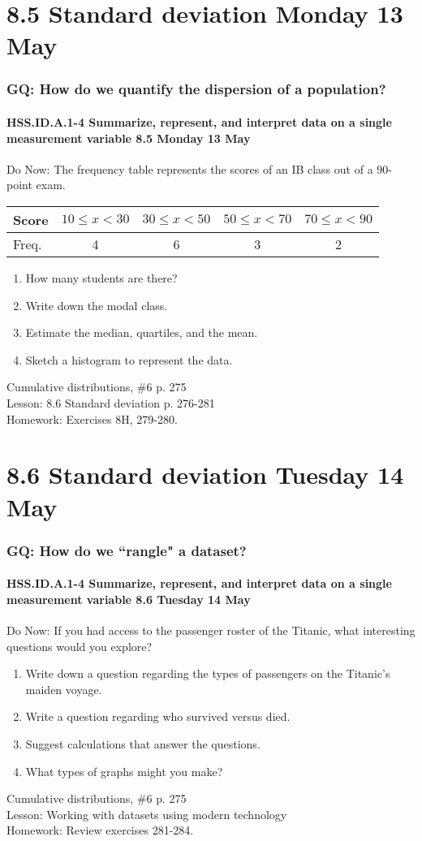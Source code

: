 \documentclass{beamer}
\begin{document}
\section{8.5 Standard deviation Monday 13 May}
  \frame
  {
    \frametitle{GQ: How do we quantify the dispersion of a population?}
    \framesubtitle{HSS.ID.A.1-4 Summarize, represent, and interpret data on a single measurement variable \hfill \alert{8.5 Monday 13 May}}

    \begin{block}{Do Now: The frequency table represents the scores of an IB class out of a 90-point exam.}
        \begin{tabular}{|l|c|c|c|c|}
          \hline
          Score & $10 \leq x<30$ &
            $30 \leq x<50$ & $50 \leq x<70$ & $70 \leq x<90$\\
          \hline
          Freq. & 4 & 6 & 3 & 2\\
          \hline
        \end{tabular}
        \begin{enumerate}
          \item How many students are there?
          \item Write down the modal class.
          \item Estimate the median, quartiles, and the mean.
          \item Sketch a histogram to represent the data.
      \end{enumerate}
    \end{block}
    Cumulative distributions, \#6 p. 275\\
    Lesson: 8.6 Standard deviation p. 276-281\\[0.5cm]
    Homework: Exercises 8H, 279-280.
  }

\section{8.6 Standard deviation Tuesday 14 May}
  \frame
  {
    \frametitle{GQ: How do we ``rangle" a dataset?}
    \framesubtitle{HSS.ID.A.1-4 Summarize, represent, and interpret data on a single measurement variable \hfill \alert{8.6 Tuesday 14 May}}

    \begin{block}{Do Now: If you had access to the passenger roster of the Titanic, what interesting questions would you explore?}
        \begin{enumerate}
          \item Write down a question regarding the types of passengers on the Titanic's maiden voyage.
          \item Write a question regarding who survived versus died.
          \item Suggest calculations that answer the questions.
          \item What types of graphs might you make?
      \end{enumerate}
    \end{block}
    Cumulative distributions, \#6 p. 275\\
    Lesson: Working with datasets using modern technology\\[0.5cm]
    Homework: Review exercises 281-284.
  }
\end{document}
